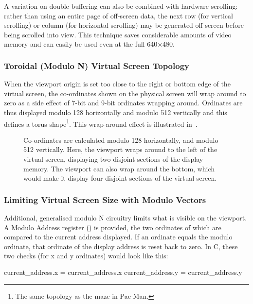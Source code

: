 A variation on double buffering can also be combined with hardware scrolling:
rather than using an entire page of off-screen data, the next row (for vertical
scrolling) or column (for horizontal scrolling) may be generated off-screen
before being scrolled into view. This technique saves considerable amounts of
video memory and can easily be used even at the full 640×480.

\subsubsection{Toroidal (Modulo N) Virtual Screen Topology}

When the viewport origin is set too close to the right or bottom edge of the
virtual screen, the co-ordinates shown on the physical screen will wrap around
to zero as a side effect of 7-bit and 9-bit ordinates wrapping
around. Ordinates are thus displayed modulo 128 horizontally and modulo 512
vertically and this defines a torus shape\footnote{The same topology as the
  maze in Pac-Man.}. This wrap-around effect is illustrated
in~.

\begin{figure}
 \centering
 \caption[Toroidal Topology of the Virtual
   Screen]{\label{fig:vdu-virtual-screen-torus} Co-ordinates are calculated
   modulo 128 horizontally, and modulo 512 vertically. Here, the viewport wraps
   around to the left of the virtual screen, displaying two disjoint sections
   of the display memory. The viewport can also wrap around the bottom, which
   would make it display four disjoint sections of the virtual screen.}
\end{figure}



\subsubsection{Limiting Virtual Screen Size with Modulo Vectors}
\label{vdu:sec:modulo-address}
Additional, generalised modulo N circuitry limits what is visible on the
viewport. A Modulo Address register () is provided, the two
ordinates of which are compared to the current address displayed. If an
ordinate equals the modulo ordinate, that ordinate of the display address is
reset back to zero. In C, these two checks (for x and y ordinates) would look
like this:

\begin{ccode}
  current_address.x = current_address.x %
  current_address.y = current_address.y %
\end{ccode}


